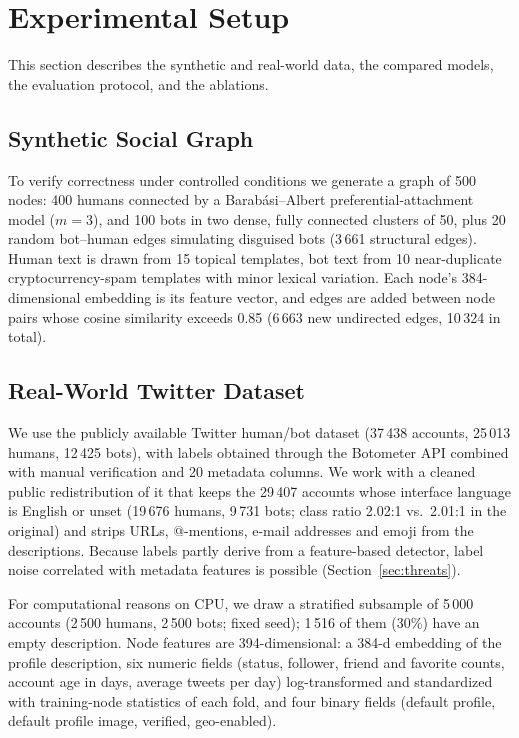 \documentclass{csimq}
\begin{document}
\section{Experimental Setup}

This section describes the synthetic and real-world data, the compared models, the evaluation protocol, and the ablations.

\subsection{Synthetic Social Graph}
To verify correctness under controlled conditions we generate a graph of 500 nodes: 400 humans connected by a Barab\'asi--Albert preferential-attachment model ($m=3$), and 100 bots in two dense, fully connected clusters of 50, plus 20 random bot--human edges simulating disguised bots (3\,661 structural edges). Human text is drawn from 15 topical templates, bot text from 10 near-duplicate cryptocurrency-spam templates with minor lexical variation. Each node's 384-dimensional embedding is its feature vector, and edges are added between node pairs whose cosine similarity exceeds 0.85 (6\,663 new undirected edges, 10\,324 in total).

\subsection{Real-World Twitter Dataset}
We use the publicly available Twitter human/bot dataset \cite{gutierrez2021twitter} (37\,438 accounts, 25\,013 humans, 12\,425 bots), with labels obtained through the Botometer API combined with manual verification and 20 metadata columns. We work with a cleaned public redistribution of it \cite{botani2024} that keeps the 29\,407 accounts whose interface language is English or unset (19\,676 humans, 9\,731 bots; class ratio 2.02:1 vs.\ 2.01:1 in the original) and strips URLs, @-mentions, e-mail addresses and emoji from the descriptions. Because labels partly derive from a feature-based detector, label noise correlated with metadata features is possible (Section~\ref{sec:threats}).

For computational reasons on CPU, we draw a stratified subsample of 5\,000 accounts (2\,500 humans, 2\,500 bots; fixed seed); 1\,516 of them (30\%) have an empty description. Node features are 394-dimensional: a 384-d embedding of the profile description, six numeric fields (status, follower, friend and favorite counts, account age in days, average tweets per day) log-transformed and standardized with training-node statistics of each fold, and four binary fields (default profile, default profile image, verified, geo-enabled).
\end{document}
